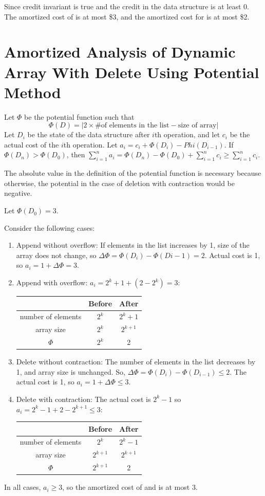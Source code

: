 Since credit invariant is true and the credit in the data structure is at least 0. The amortized cost of  is at most \$3, and the amortized cost for  is at most \$2.

\section{Amortized Analysis of Dynamic Array With Delete Using Potential Method}

Let $\Phi$ be the potential function such that
$$
\Phi(D) = | 2 \times \text{\# of elements in the list} - \text{size of array} |
$$
Let $D_i$ be the state of the data structure after $i$th operation, and let $c_i$ be the actual cost of the $i$th operation. Let $a_i = c_i + \Phi(D_i) - Phi(D_{i-1})$. If $\Phi(D_n) > \Phi(D_0)$, then $\sum_{i=1}^n a_i = \Phi(D_n) - \Phi(D_0) + \sum_{i=1}^n c_i \geq \sum_{i=1}^{n} c_i$.

The absolute value in the definition of the potential function is necessary because otherwise, the potential in the case of deletion with contraction would be negative.

Let $\Phi(D_0) = 3$. 

Consider the following cases:

\begin{enumerate}
    \item Append without overflow: If elements in the list increases by 1, size of the array does not change, so $\Delta\Phi = \Phi(D_i)-\Phi(D{i-1}) = 2$. Actual cost is 1, so $a_i = 1+\Delta\Phi = 3$.
    \item Append with overflow: $a_i = 2^k + 1 + (2-2^k) = 3$:
    \begin{center}
        \begin{tabular}{c|c|c|}
             & Before & After \\
            \hline
            number of elements & $2^k$ & $2^k + 1$ \\
            array size & $2^{k}$ & $2^{k+1}$ \\
            $\Phi$ & $2^{k}$ & 2   
        \end{tabular}
    \end{center}
    \item Delete without contraction: The number of elements in the list decreases by 1, and array size is unchanged. So, $\Delta\Phi = \Phi(D_i) - \Phi(D_{i-1}) \leq 2$. The actual cost is 1, so $a_i = 1 + \Delta\Phi \leq 3$.
    \item Delete with contraction: The actual cost is $2^k - 1$ so $a_i = 2^k - 1 + 2 - 2^{k+1} \leq 3$:
    \begin{center}
        \begin{tabular}{c|c|c|}
             & Before & After \\
            \hline
            number of elements & $2^k$ & $2^k - 1$ \\
            array size & $2^{k+1}$ & $2^{k+1}$ \\
            $\Phi$ & $2^{k+1}$ & 2   
        \end{tabular}
    \end{center}
\end{enumerate}

In all cases, $a_i \geq 3$, so the amortized cost of  and  is at most 3.